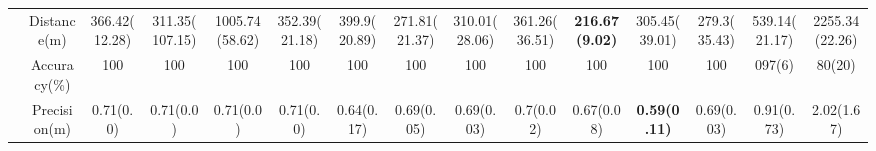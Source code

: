\documentclass{article}
\begin{document}
\begin{table}
{\begin{tabular}{c|cccccccccccccc}
    \multicolumn{1}{c|}{}                         & \multicolumn{1}{c|}{Distance(m)} & 366.42(12.28) & 311.35(107.15) & 1005.74(58.62) & 352.39(21.18) & 399.9(20.89) & 271.81(21.37) & 310.01(28.06) & 361.26(36.51) & \textbf{216.67(9.02)} & 305.45(39.01) & 279.3(35.43) & 539.14(21.17) & 2255.34(22.26)\\
    \multicolumn{1}{c|}{}                         & \multicolumn{1}{c|}{Accuracy(\%)} & 100 & 100 & 100 & 100 & 100 & 100 & 100 & 100 & 100 & 100 & 100 & 097(6) & 80(20)\\
    \multicolumn{1}{c|}{}                         & \multicolumn{1}{c|}{Precision(m)} & 0.71(0.0) & 0.71(0.0) & 0.71(0.0) & 0.71(0.0) & 0.64(0.17) & 0.69(0.05) & 0.69(0.03) & 0.7(0.02) & 0.67(0.08) & \textbf{0.59(0.11)} & 0.69(0.03) & 0.91(0.73) & 2.02(1.67)\\ \hline
    \end{tabular}}
\end{table}
\end{document}
